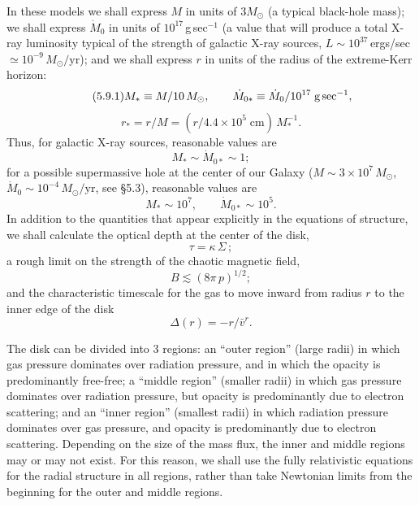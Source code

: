 In these models we shall express $M$ in units of $3M_\odot$ (a typical black-hole mass);
we shall express $\dot{M}_0$ in units of $10^{17}$\,g\,sec$^{-1}$
(a value that will produce
a total X-ray luminosity typical of the strength of galactic X-ray sources,
$L \sim 10^{37}$\,ergs/sec $\simeq 10^{-9}\,M_\odot/\text{yr}$);
and we shall express $r$ in units of the radius of the extreme-Kerr
horizon:
%
\begin{equation}
\tag{5.9.1}
M_* \equiv M / 10\,M_\odot, \qquad
\dot{M}_{0*} \equiv \dot{M}_0 / 10^{17}\;\text{g\,sec}^{-1},
\end{equation}
%
\begin{equation}
r_* = r/M = (r / 4.4 \times 10^5\;\text{cm})\, M_*^{-1}.
\end{equation}
%
Thus, for galactic X-ray sources, reasonable values are
%
\begin{equation}
\tag{5.9.2a}
M_* \sim \dot{M}_{0*} \sim 1;
\end{equation}
%
for a possible supermassive hole at the center of our Galaxy
($M \sim 3 \times 10^7\,M_\odot$,
$\dot{M}_0 \sim 10^{-4}\,M_\odot/\text{yr}$, see \S5.3), reasonable values are
%
\begin{equation}
\tag{5.9.2b}
M_* \sim 10^7, \qquad \dot{M}_{0*} \sim 10^5.
\end{equation}
%
In addition to the quantities that appear explicitly in the equations of structure,
we shall calculate the optical depth at the center of the disk,
%
\begin{equation}
\tag{5.9.3}
\tau = \kappa\,\Sigma\,;
\end{equation}
%
a rough limit on the strength of the chaotic magnetic field,
%
\begin{equation}
\tag{5.9.4}
B \lesssim (8\pi\, p)^{1/2};
\end{equation}
%
and the characteristic timescale for the gas to move inward from radius $r$ to the
inner edge of the disk
%
\begin{equation}
\tag{5.9.5}
\Delta(r) = -r/\bar{v}^r.
\end{equation}

The disk can be divided into 3 regions: an ``outer region'' (large radii) in
which gas pressure dominates over radiation pressure, and in which the opacity
is predominantly free-free; a ``middle region'' (smaller radii) in which gas
pressure dominates over radiation pressure, but opacity is predominantly due
to electron scattering; and an ``inner region'' (smallest radii) in which radiation
pressure dominates over gas pressure, and opacity is predominantly due to
electron scattering.  Depending on the size of the mass flux, the inner and middle
regions may or may not exist.  For this reason, we shall use the fully relativistic
equations for the radial structure in all regions, rather than take Newtonian
limits from the beginning for the outer and middle regions.

